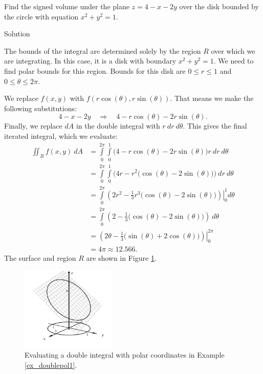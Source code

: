 \pagebreak
\begin{example}\label{ex_doublepol1}
Find the signed volume under the plane $z= 4-x-2y$ over the disk bounded by the circle with equation $x^2+y^2=1$.

Solution 

The bounds of the integral are determined solely by the region $R$ over which we are integrating. In this case, it is a disk with boundary $x^2+y^2=1$. We need to find polar bounds for this region. Bounds for this disk are $0\leq r\leq 1$ and $0\leq \theta\leq 2\pi$.

We replace $f(x,y)$ with $f\left(r\cos(\theta),r\sin(\theta)\right)$. That means we make the following substitutions:
$$4-x-2y \quad \Rightarrow \quad 4-r\cos(\theta)-2r\sin(\theta).$$
Finally, we replace $dA$ in the double integral with $r\ dr\ d\theta$. This gives the final iterated integral, which we evaluate:
\allowdisplaybreaks
\begin{align*}
\iint_Rf(x,y)\ dA &= \int\limits_0^{2\pi}\int\limits_0^1\big(4-r\cos(\theta)-2r\sin(\theta)\big)r\ dr\ d\theta\\
						&= \int\limits_0^{2\pi}\int\limits_0^1\Big(4r-r^2\big(\cos(\theta)-2\sin(\theta)\big)\Big)\ dr\ d\theta\\
						&= \int\limits_0^{2\pi}\left.\left(2r^2-\frac13r^3\big(\cos(\theta)-2\sin(\theta)\big)\right)\right|_0^1d\theta\\
						&= \int\limits_0^{2\pi} \left(2-\frac13\big(\cos(\theta)-2\sin(\theta)\big)\right)\ d\theta\\
						&= \left.\left(2\theta -\frac13\big(\sin(\theta)+2\cos(\theta)\big)\right)\right|_0^{2\pi} \\
						&= 4\pi \approx 12.566.
\end{align*}
The surface and region $R$ are shown in Figure \ref{fig_multiple_13}.

\begin{figure}[H]
	\begin{center}
			\includegraphics[width=0.4\textwidth]{fig_multiple_13}
	\caption{Evaluating a double integral with polar coordinates in Example \ref{ex_doublepol1}.}
	\label{fig_multiple_13}
	\end{center}
\end{figure}

\end{example}

